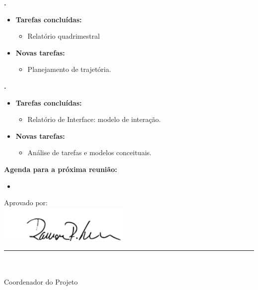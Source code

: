   \textbf{\elael.} 
	\begin{itemize}
		\item \textbf{Tarefas concluídas:}
			\begin{itemize}    
				\item Relatório quadrimestral
			\end{itemize}
		
		\item \textbf{Novas tarefas:}
			\begin{itemize} 
				\item Planejamento de trajetória.
			\end{itemize}
	\end{itemize}	
			
   \textbf{\julia.} 
	\begin{itemize}
		\item \textbf{Tarefas concluídas:}
			\begin{itemize}    
				\item Relatório de Interface: modelo de interação.
			\end{itemize}
		
		\item \textbf{Novas tarefas:}
			\begin{itemize} 
			    \item Análise de tarefas e modelos conceituais.
			\end{itemize}
	\end{itemize}		



\textbf{Agenda para a próxima reunião:}
  \begin{itemize}
    \item 
  \end{itemize}


\vspace{5mm}%
\parbox[t]{70mm}{
  Aprovado por: \\[5mm]
  \centering
  \includegraphics[width=65mm]{figs/logo/assinatura-ramon.png} \\[-4mm]
  \rule[2mm]{70mm}{0.1mm} \\
  \ramon \\[1mm]
  Coordenador do Projeto \\
}

\fim